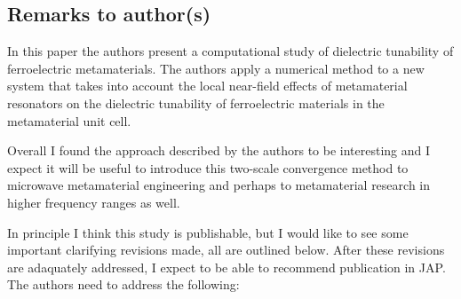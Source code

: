 \documentclass[%
 aip,
 amsmath,amssymb,
 reprint,%
]{revtex4-1}
\begin{document}
\subsection{Remarks to author(s)}

In this paper the authors present a computational study of dielectric tunability of ferroelectric
 metamaterials. The authors apply a numerical method to a new system that takes into account the
 local near-field effects of metamaterial resonators on the dielectric tunability of ferroelectric
 materials in the metamaterial unit cell.

Overall I found the approach described by the authors to be interesting and I expect it will be useful to
 introduce this two-scale convergence method to microwave metamaterial engineering and perhaps to
  metamaterial research in higher frequency ranges as well.

In principle I think this study is publishable, but I would like to see some important clarifying revisions
 made, all are outlined below. After these revisions are adaquately addressed, I expect to be able to
  recommend publication in JAP. The authors need to address the following:
\end{document}
